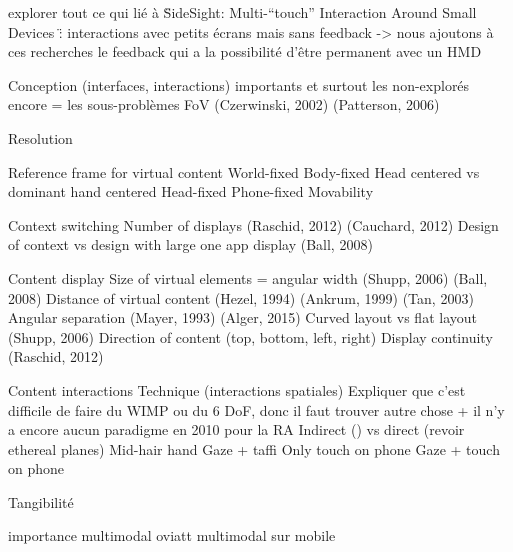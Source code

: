 explorer tout ce qui lié à \"SideSight: Multi-“touch” Interaction Around Small Devices \" : interactions avec petits écrans mais sans feedback -> nous ajoutons à ces recherches le feedback qui a la possibilité d'être permanent avec un HMD

Conception (interfaces, interactions) importants et surtout les non-explorés encore = les sous-problèmes
        FoV (Czerwinski, 2002) (Patterson, 2006) \cite{KishishitaKiyokawaOrloskyEtAl2014} 

        Resolution 

        Reference frame for virtual content 
            World-fixed \cite{EnsFinneganIrani2014} 
            Body-fixed \cite{EnsFinneganIrani2014} 
                Head centered vs dominant hand centered 
            Head-fixed \cite{EnsFinneganIrani2014} 
            Phone-fixed
            Movability \cite{EnsHincapie-RamosIrani2014}

        Context switching 
            Number of displays (Raschid, 2012) (Cauchard, 2012) 
            Design of context vs design with large one app display (Ball, 2008) 

        Content display
            Size of virtual elements = angular width (Shupp, 2006) (Ball, 2008) 
            Distance of virtual content (Hezel, 1994) (Ankrum, 1999) (Tan, 2003) \cite{ChanKaoChenEtAl2010} \cite{EnsFinneganIrani2014} 
            Angular separation (Mayer, 1993) \cite{EnsFinneganIrani2014} \cite{KishishitaKiyokawaOrloskyEtAl2014} (Alger, 2015) 
            Curved layout vs flat layout (Shupp, 2006) 
            Direction of content (top, bottom, left, right) \cite{EnsFinneganIrani2014} 
            Display continuity \cite{TanCzerwinski2003} (Raschid, 2012)

        Content interactions
        	Technique (interactions spatiales)
	        	Expliquer que c'est difficile de faire du WIMP ou du 6 DoF, donc il faut trouver autre chose \citet{AzumaBaillotBehringerEtAl2001} + il n'y a encore aucun paradigme en 2010 pour la RA \cite{VanKrevelenPoelman2010}
	        	Indirect (\cite{TeatherStuerzlinger2011}) vs direct (revoir ethereal planes)
	            Mid-hair hand \cite{EnsFinneganIrani2014} \cite{ChanKaoChenEtAl2010} \cite{JonesSodhiForsythEtAl2012}
	            Gaze + taffi 
	            Only touch on phone 
	            Gaze + touch on phone

	        Tangibilité

            importance multimodal oviatt \cite{Oviatt2003}
            multimodal sur mobile \cite{HuerstVanWezel2011}

